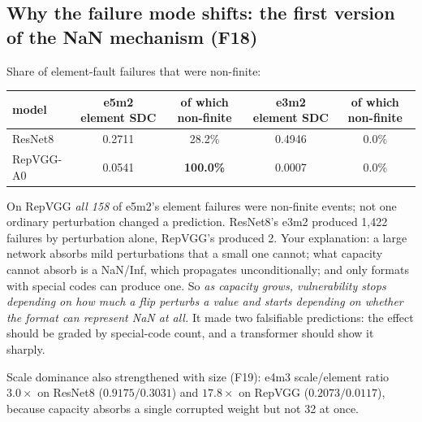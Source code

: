 \subsection{Why the failure mode shifts: the first version of the NaN mechanism (F18)}
Share of element-fault failures that were non-finite:
\begin{center}
\small
\begin{tabular}{lcccc}
\toprule
model & e5m2 element SDC & of which non-finite & e3m2 element SDC & of which non-finite \\
\midrule
ResNet8 & 0.2711 & 28.2\% & 0.4946 & 0.0\% \\
RepVGG-A0 & 0.0541 & \textbf{100.0\%} & 0.0007 & 0.0\% \\
\bottomrule
\end{tabular}
\end{center}
On RepVGG \emph{all 158} of e5m2's element failures were non-finite events; not one ordinary perturbation changed a prediction. ResNet8's e3m2 produced 1{,}422 failures by perturbation alone, RepVGG's produced 2. Your explanation: a large network absorbs mild perturbations that a small one cannot;
what capacity cannot absorb is a NaN/Inf, which propagates unconditionally; and only formats with special codes can produce one. So \emph{as capacity grows, vulnerability stops depending on how much a flip perturbs a value and starts depending on whether the format can represent NaN at all.}
It made two falsifiable predictions: the effect should be graded by special-code count, and a transformer should show it sharply.

Scale dominance also strengthened with size (F19): e4m3 scale/element ratio $3.0\times$ on ResNet8 ($0.9175/0.3031$) and $17.8\times$ on RepVGG ($0.2073/0.0117$), because capacity absorbs a single corrupted weight but not 32 at once.

